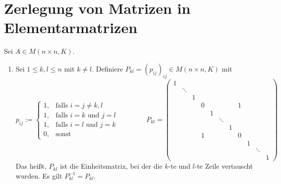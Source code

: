 \section{Zerlegung von Matrizen in Elementarmatrizen}

\begin{definition}[Elementarmatrizen]
	\label{def:I.7.1}
	Sei $A \in M(n \times n,K)$. 
	\begin{enumerate}[(1)]
		\item	Sei $1 \leq k,l \leq n$ mit $k \neq l$.
		Definiere $P_{kl} = (p_{ij})_{ij} \in M(n \times n,K)$ mit
		\[ p_{ij} := \begin{cases}
			1, & \text{falls } i = j \neq k,l \\
			1, & \text{falls } i=k \text{ und } j=l \\
			1, & \text{falls } i=l \text{ und } j=k \\
			0, & \text{sonst}
		\end{cases} \qquad \qquad
		P_{kl} =
			\begin{pmatrix}
				1 &  &  &  &  &  &  &  &  &  &  \\ 
				& \ddots &  &  &  &  &  &  &  &  &  \\ 
				&  & 1 &  &  &  &  &  &  &  &  \\ 
				&  &  & 0 &  &  &  & 1 &  &  &  \\ 
				&  &  &  & 1 &  &  &  &  &  &  \\ 
				&  &  &  &  & \ddots &  &  &  &  &  \\ 
				&  &  &  &  &  & 1 &  &  &  &  \\ 
				&  &  & 1 &  &  &  & 0 &  &  &  \\ 
				&  &  &  &  &  &  &  & 1 &  &  \\ 
				&  &  &  &  &  &  &  &  & \ddots &  \\ 
				&  &  &  &  &  &  &  &  &  & 1
				\end{pmatrix}
		\]
		Das heißt, $P_{kl}$ ist die Einheitsmatrix, bei der die $k$-te und $l$-te Zeile vertauscht wurden.
		Es gilt $P_{kl}^{-1} = P_{kl}$.
		

\end{enumerate}
\end{definition}

